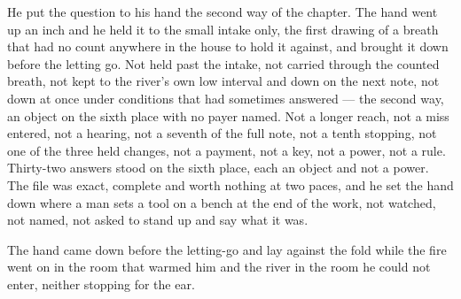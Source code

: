 He put the question to his hand the second way of the chapter. The hand went up an inch and he held it to the small intake only, the first drawing of a breath that had no count anywhere in the house to hold it against, and brought it down before the letting go. Not held past the intake, not carried through the counted breath, not kept to the river's own low interval and down on the next note, not down at once under conditions that had sometimes answered --- the second way, an object on the sixth place with no payer named. Not a longer reach, not a miss entered, not a hearing, not a seventh of the full note, not a tenth stopping, not one of the three held changes, not a payment, not a key, not a power, not a rule. Thirty-two answers stood on the sixth place, each an object and not a power. The file was exact, complete and worth nothing at two paces, and he set the hand down where a man sets a tool on a bench at the end of the work, not watched, not named, not asked to stand up and say what it was.

The hand came down before the letting-go and lay against the fold while the fire went on in the room that warmed him and the river in the room he could not enter, neither stopping for the ear.
